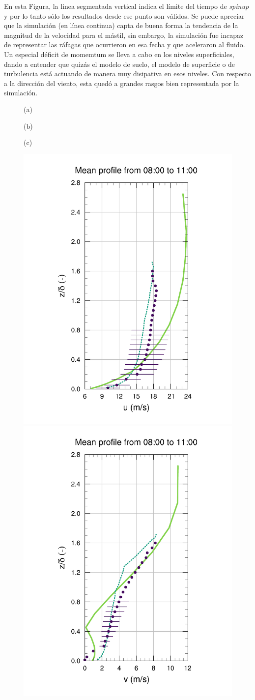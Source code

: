 En esta Figura, la linea segmentada vertical indica el límite del tiempo de \emph{spinup} y por lo tanto sólo los resultados desde ese punto son válidos. Se puede apreciar que la simulación (en línea continua) capta de buena forma la tendencia de la magnitud de la velocidad para el mástil, sin embargo, la simulación fue incapaz de representar las ráfagas que ocurrieron en esa fecha y que aceleraron al fluido. Un especial déficit de momemtum se lleva a cabo en los niveles superficiales, dando a entender que quizás el modelo de suelo, el modelo de superficie o de turbulencia está actuando de manera muy disipativa en esos niveles. Con respecto a la dirección del viento, esta quedó a grandes rasgos bien representada por la simulación.

\begin{figure}[H]
	\begin{minipage}{0.33\linewidth}
		\centering \hspace{1.5cm}(a)
	\end{minipage}%
	\begin{minipage}{0.33\linewidth}
		\centering \hspace{1cm}(b)
	\end{minipage}%
	\begin{minipage}{0.33\linewidth}
		\centering \hspace{1cm}(c)
	\end{minipage}%
	\vspace{-3mm}
	\begin{center}
	\includegraphics[height=0.62\linewidth,page=37,trim={35mm 10mm 41mm 25mm},clip]{Imagenes/06/hov/9u}%
	\includegraphics[height=0.62\linewidth,page=37,trim={48mm 10mm 41mm 25mm},clip]{Imagenes/06/hov/9v}%

\end{center}
\end{figure}
